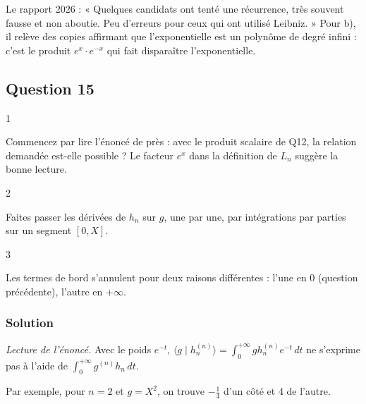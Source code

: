 \documentclass[11pt,a4paper]{article}
\begin{document}
\begin{jury}

Le rapport 2026 : « Quelques candidats ont tenté une récurrence, très souvent fausse et non aboutie. Peu d'erreurs pour ceux qui ont utilisé Leibniz. » Pour b), il relève des copies affirmant que l'exponentielle est un polynôme de degré infini : c'est le produit \(e^x\cdot e^{-x}\) qui fait disparaître l'exponentielle.

\end{jury}

\hypertarget{question-15}{%
\subsection{Question 15}\label{question-15}}

\begin{indication}{1}

Commencez par lire l'énoncé de près : avec le produit scalaire de Q12, la relation demandée est-elle possible ? Le facteur \(e^x\) dans la définition de \(L_n\) suggère la bonne lecture.

\end{indication}

\begin{indication}{2}

Faites passer les dérivées de \(h_n\) sur \(g\), une par une, par intégrations par parties sur un segment \([0,X]\).

\end{indication}

\begin{indication}{3}

Les termes de bord s'annulent pour deux raisons différentes : l'une en \(0\) (question précédente), l'autre en \(+\infty\).

\end{indication}

\hypertarget{solution-14}{%
\subsubsection{Solution}\label{solution-14}}

\emph{Lecture de l'énoncé.} Avec le poids \(e^{-t}\), \(\langle g\mid h_n^{(n)}\rangle=\int_0^{+\infty}gh_n^{(n)}e^{-t}\,dt\) ne s'exprime pas à l'aide de \(\int_0^{+\infty}g^{(n)}h_n\,dt\).

Par exemple, pour \(n=2\) et \(g=X^2\), on trouve \(-\frac14\) d'un côté et \(4\) de l'autre.
\end{document}
